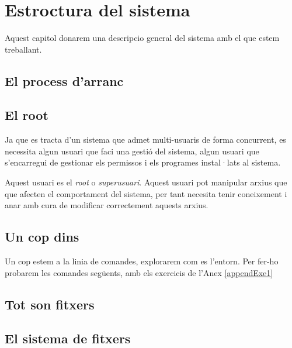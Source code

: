 \section{Estroctura del sistema}

Aquest capitol donarem una descripcio general del sistema amb el que estem treballant.

\subsection{El process d'arranc}

\subsection{El root}

\par
Ja que es tracta d'un sistema que admet multi-usuaris de forma concurrent, es necessita algun usuari que faci una gestió del sistema, algun usuari que s'encarregui de gestionar els permissos i els programes instal·lats al sistema.
\par
Aquest usuari es el \textit{root} o  \textit{superusuari}. Aquest usuari pot manipular arxius que que afecten el comportament del sistema, per tant necesita tenir coneixement i anar amb cura de modificar correctement aquests arxius.

\subsection{Un cop dins}

Un cop estem a la linia de comandes, explorarem com es l'entorn. Per fer-ho probarem les comandes següents, amb els exercicis de l'Anex \ref{appendExe1}


\subsection{Tot son fitxers}

\subsection{El sistema de fitxers}


